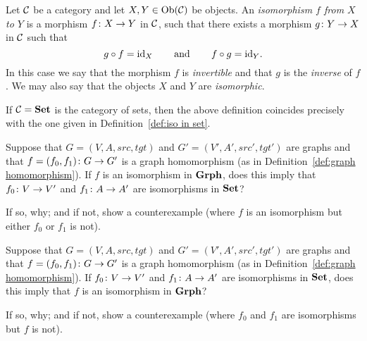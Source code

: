 \documentclass[CT4S-EN-RU]{subfiles}
\begin{document}
\begin{blockRUS}
\end{blockRUS}

\begin{definitionENG}
Let $\mathcal{C}$ be a category and let $X,Y\in\textnormal{Ob}(\mathcal{C})$ be objects. An {\em isomorphism $f$ from $X$ to $Y$} is a morphism $f\colon X\rightarrow Y$ in $\mathcal{C}$, such that there exists a morphism $g\colon Y\rightarrow X$ in $\mathcal{C}$ such that $$g\circ f=\textnormal{id}_X\hspace{.3in}\textnormal{and}\hspace{.3in} f\circ g=\textnormal{id}_Y.$$ In this case we say that the morphism $f$ is {\em invertible} and that $g$ is the {\em inverse} of $f$. We may also say that the objects $X$ and $Y$ are {\em isomorphic}.
\end{definitionENG}

\begin{definitionRUS}
\end{definitionRUS}

\begin{exampleENG}
If $\mathcal{C}={\mathbf{Set}}$ is the category of sets, then the above definition coincides precisely with the one given in Definition~\ref{def:iso in set}.
\end{exampleENG}

\begin{exampleRUS}
\end{exampleRUS}

\begin{exerciseENG}
Suppose that $G=(V,A,src,tgt)$ and $G'=(V',A',src',tgt')$ are graphs and that $f=(f_0,f_1)\colon G\rightarrow G'$ is a graph homomorphism (as in Definition~\ref{def:graph homomorphism}). 
\sexc If $f$ is an isomorphism in ${\mathbf{Grph}}$, does this imply that $f_0\colon V\rightarrow V'$ and $f_1\colon A\rightarrow A'$ are isomorphisms in ${\mathbf{Set}}$?
\item  If so, why; and if not, show a counterexample (where $f$ is an isomorphism but either $f_0$ or $f_1$ is not).
\endsexc
\end{exerciseENG}

\begin{exerciseRUS}
\end{exerciseRUS}

\begin{exerciseENG}
Suppose that $G=(V,A,src,tgt)$ and $G'=(V',A',src',tgt')$ are graphs and that $f=(f_0,f_1)\colon G\rightarrow G'$ is a graph homomorphism (as in Definition~\ref{def:graph homomorphism}). 
\sexc If $f_0\colon V\rightarrow V'$ and $f_1\colon A\rightarrow A'$ are isomorphisms in ${\mathbf{Set}}$, does this imply that $f$ is an isomorphism in ${\mathbf{Grph}}$?
\item If so, why; and if not, show a counterexample (where $f_0$ and $f_1$ are isomorphisms but $f$ is not).
\endsexc
\end{exerciseENG}
\end{document}
